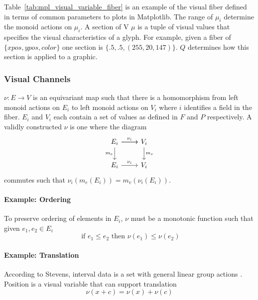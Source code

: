 \documentclass[../main.tex]{subfiles}
\begin{document}
Table~\ref{tab:mpl_visual_variable_fiber} is an example of the visual fiber defined in terms of common parameters to plots in Matplotlib. The range of $\mu_{i}$ determine the monoid actions on $\mu_{i}$. A section of V $\mu$ is a tuple of visual values that specifies the visual characteristics of a glyph. For example, given a fiber of $\{xpos, ypos, color\}$ one section is $\{.5, .5, (255, 20,147)\}$. $Q$ determines how this section is applied to a graphic.  

\subsubsection{Visual Channels}
$\nu: E \rightarrow V$ is an equivariant map such that there is a homomorphism from left monoid actions on $E_{i}$ to left monoid actions on $V_{i}$ where $i$ identifies a field in the fiber. $E_i$ and $V_{i}$ each contain a set of values as defined in $F$ and $P$ respectively. A validly constructed $\nu$ is one where the  diagram 
\begin{equation}
    \label{eq:nu_categorical}
\begin{tikzcd}
    E_i \arrow[r] \arrow[r, "\nu_i"] \arrow[d, "m_e"'] & V_i \arrow[d, "m_v"] \\
    E_i \arrow[r, "\nu_i"]                           & V_i               
\end{tikzcd}
\end{equation}
commutes such that $\nu_i(m_e(E_i)) = m_v(\nu_i(E_i))$.

\paragraph{Example: Ordering}
To preserve ordering of elements in $E_i$, $\nu$ must be a monotonic function such that given $e_1, e_2 \in E_{i}$
\begin{equation}
\text{ if } e_1 \leq e_2 \text{ then } \nu(e_1) \leq \nu(e_2)
\end{equation}

\paragraph{Example: Translation}
According to Stevens, interval data is a set with general linear group actions \cite{stevensTheoryScalesMeasurement1946,leaFormalizationMeasurementScale}. Position is a visual variable that can support translation 
\begin{equation}
\nu(x + c) = \nu(x) + \nu(c)
\end{equation}
\end{document}
